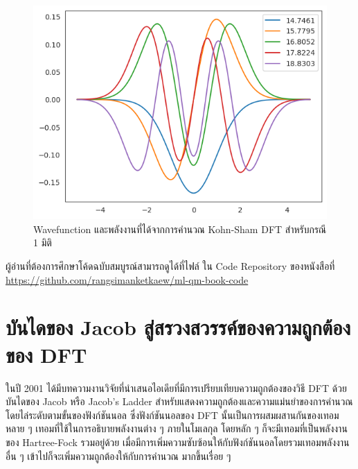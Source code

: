 \begin{figure}[H]
    \centering
    \includegraphics[width=0.9\linewidth]{fig/ks_dft_1d_wfn_ener.png}
    \caption{Wavefunction และพลังงานที่ได้จากการคำนวณ Kohn-Sham DFT สำหรับกรณี 1 มิติ}
    \label{fig:ks_dft_1d_wfn_ener}
\end{figure}

ผู้อ่านที่ต้องการศึกษาโค้ดฉบับสมบูรณ์สามารถดูได้ที่ไฟล์  ใน Code Repository ของหนังสือที่
\url{https://github.com/rangsimanketkaew/ml-qm-book-code}

\section{บันไดของ Jacob สู่สรวงสวรรค์ของความถูกต้องของ DFT}
\label{sec:jacob_ladder}

ในปี 2001 ได้มีบทความงานวิจัยที่นำเสนอไอเดียที่มีการเปรียบเทียบความถูกต้องของวิธี DFT ด้วยบันไดของ Jacob หรือ Jacob's Ladder
สำหรับแสดงความถูกต้องและความแม่นยำของการคำนวณโดยไล่ระดับตามขั้นของฟังก์ชันนอล\autocite{perdew2001} ซึ่งฟังก์ชันนอลของ DFT
นั้นเป็นการผสมผสานกันของเทอมหลาย ๆ เทอมที่ใช้ในการอธิบายพลังงานต่าง ๆ ภายในโมเลกุล โดยหลัก ๆ ก็จะมีเทอมที่เป็นพลังงานของ
Hartree-Fock รวมอยู่ด้วย เมื่อมีการเพิ่มความซับซ้อนให้กับฟังก์ชันนอลโดยรวมเทอมพลังงานอื่น ๆ เข้าไปก็จะเพิ่มความถูกต้องให้กับการคำนวณ%
มากขึ้นเรื่อย ๆ

